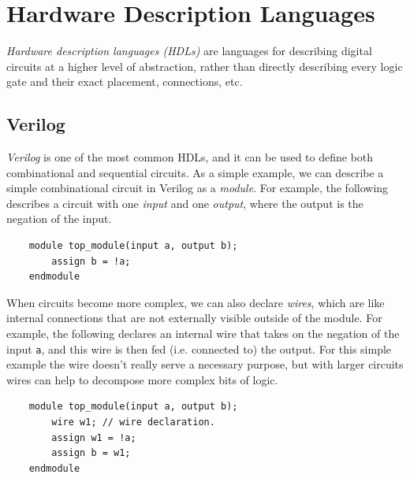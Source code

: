 \documentclass[10pt,a4paper]{article}
\begin{document}
\section{Hardware Description Languages}


\textit{Hardware description languages (HDLs)} are languages for describing digital circuits at a higher level of abstraction, rather than directly describing every logic gate and their exact placement, connections, etc. 

\subsection*{Verilog}

\textit{Verilog} is one of the most common HDLs, and it can be used to define both combinational and sequential circuits. As a simple example, we can describe a simple combinational circuit in Verilog as a \textit{module}. For example, the following describes a circuit with one \textit{input} and one \textit{output}, where the output is the negation of the input.
\begin{verbatim}
    module top_module(input a, output b);
        assign b = !a;
    endmodule
\end{verbatim}
When circuits become more complex, we can also declare \textit{wires}, which are like internal connections that are not externally visible outside of the module. For example, the following declares an internal wire that takes on the negation of the input \verb|a|, and this wire is then fed (i.e. connected to) the output. For this simple example the wire doesn't really serve a necessary purpose, but with larger circuits wires can help to decompose more complex bits of logic.
\begin{verbatim}
    module top_module(input a, output b);
        wire w1; // wire declaration.
        assign w1 = !a;
        assign b = w1;
    endmodule
\end{verbatim}



\end{document}
